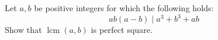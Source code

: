 Let $a,b$ be positive integers for which the following holds:
$$ab(a-b) \mid a^3+b^3+ab$$
Show that $\operatorname{lcm}(a,b)$ is perfect square.
